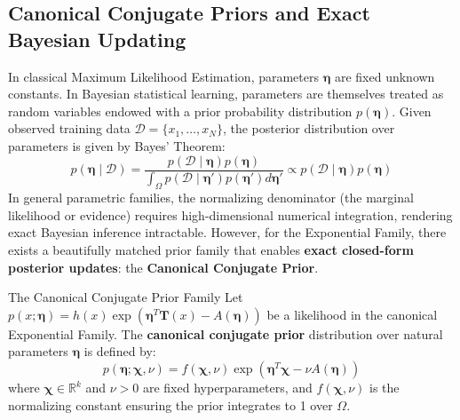 \subsection{Canonical Conjugate Priors and Exact Bayesian Updating}
In classical Maximum Likelihood Estimation, parameters $\boldsymbol{\eta}$ are fixed unknown constants. In Bayesian statistical learning, parameters are themselves treated as random variables endowed with a prior probability distribution $p(\boldsymbol{\eta})$. Given observed training data $\mathcal{D} = \{x_1, \dots, x_N\}$, the posterior distribution over parameters is given by Bayes' Theorem:
\begin{equation}
p(\boldsymbol{\eta} \mid \mathcal{D}) = \frac{p(\mathcal{D} \mid \boldsymbol{\eta}) p(\boldsymbol{\eta})}{\int_\Omega p(\mathcal{D} \mid \boldsymbol{\eta}') p(\boldsymbol{\eta}') d\boldsymbol{\eta}'} \propto p(\mathcal{D} \mid \boldsymbol{\eta}) p(\boldsymbol{\eta})
\label{eq:bayes_posterior_def}
\end{equation}
In general parametric families, the normalizing denominator (the marginal likelihood or evidence) requires high-dimensional numerical integration, rendering exact Bayesian inference intractable. However, for the Exponential Family, there exists a beautifully matched prior family that enables \textbf{exact closed-form posterior updates}: the \textbf{Canonical Conjugate Prior}.

\begin{definitionbox}{The Canonical Conjugate Prior Family}
Let $p(x; \boldsymbol{\eta}) = h(x)\exp(\boldsymbol{\eta}^T \mathbf{T}(x) - A(\boldsymbol{\eta}))$ be a likelihood in the canonical Exponential Family. The \textbf{canonical conjugate prior} distribution over natural parameters $\boldsymbol{\eta}$ is defined by:
\begin{equation}
p(\boldsymbol{\eta}; \boldsymbol{\chi}, \nu) = f(\boldsymbol{\chi}, \nu) \exp\left( \boldsymbol{\eta}^T \boldsymbol{\chi} - \nu A(\boldsymbol{\eta}) \right)
\label{eq:canonical_conjugate_prior}
\end{equation}
where $\boldsymbol{\chi} \in \mathbb{R}^k$ and $\nu > 0$ are fixed hyperparameters, and $f(\boldsymbol{\chi}, \nu)$ is the normalizing constant ensuring the prior integrates to 1 over $\Omega$.
\end{definitionbox}

